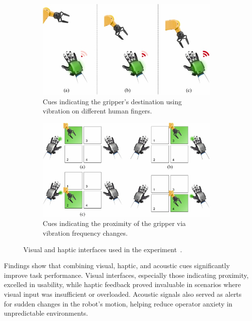 \begin{figure}[htp]
    \centering
    \begin{subfigure}{\textwidth}
        \centering
        \includegraphics[width=0.7\linewidth]{figs/haptic-cues.jpg}
        \caption{Cues indicating the gripper’s destination using vibration on different human fingers.}
        \label{fig:sfig1}
    \end{subfigure}

    \vspace{0.5cm} %
    
    \begin{subfigure}{\textwidth}
        \centering
        \includegraphics[width=0.7\linewidth]{figs/visual-cues.jpg}
        \caption{Cues indicating the proximity of the gripper via vibration frequency changes.}
        \label{fig:sfig2}
    \end{subfigure}
    
    \caption{Visual and haptic interfaces used in the experiment~\cite{CHU2023313}.}
    \label{fig:haptic-visual-cues}
\end{figure}


Findings show that combining visual, haptic, and acoustic cues significantly improve task performance. Visual interfaces, especially those indicating proximity, excelled in usability, while haptic feedback proved invaluable in scenarios where visual input was insufficient or overloaded. Acoustic signals also served as alerts for sudden changes in the robot's motion, helping reduce operator anxiety in unpredictable environments.


